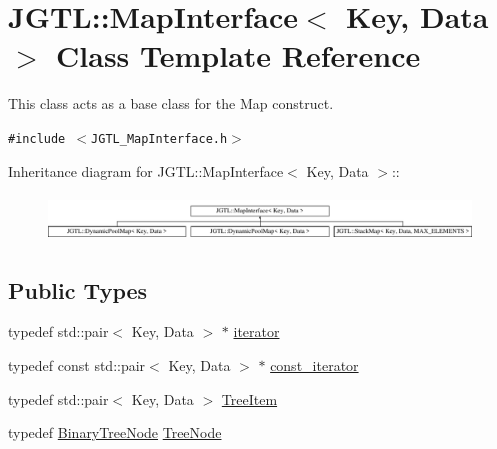 \hypertarget{class_j_g_t_l_1_1_map_interface}{
\section{JGTL::Map\-Interface$<$ Key, Data $>$ Class Template Reference}
\label{class_j_g_t_l_1_1_map_interface}
}
This class acts as a base class for the Map construct.  


{\tt \#include $<$JGTL\_\-Map\-Interface.h$>$}

Inheritance diagram for JGTL::Map\-Interface$<$ Key, Data $>$::\begin{figure}[H]
\begin{center}
\leavevmode
\includegraphics[height=1.22807cm]{class_j_g_t_l_1_1_map_interface}
\end{center}
\end{figure}
\subsection*{Public Types}
\begin{CompactItemize}
\item 
typedef std::pair$<$ Key, Data $>$ $\ast$ \hyperlink{class_j_g_t_l_1_1_map_interface_a8fcdbd899d0df84ce1aaa67d8dc000e}{iterator}
\item 
typedef const std::pair$<$ Key, Data $>$ $\ast$ \hyperlink{class_j_g_t_l_1_1_map_interface_bbce6cc516069a5a504e0ae5b9aecd88}{const\_\-iterator}
\item 
typedef std::pair$<$ Key, Data $>$ \hyperlink{class_j_g_t_l_1_1_map_interface_b7e9654bf9b2a906465e362475466ca5}{Tree\-Item}
\item 
typedef \hyperlink{class_j_g_t_l_1_1_binary_tree_node}{Binary\-Tree\-Node} \hyperlink{class_j_g_t_l_1_1_map_interface_0e980afab09f7663362337e025f73540}{Tree\-Node}
\end{CompactItemize}
